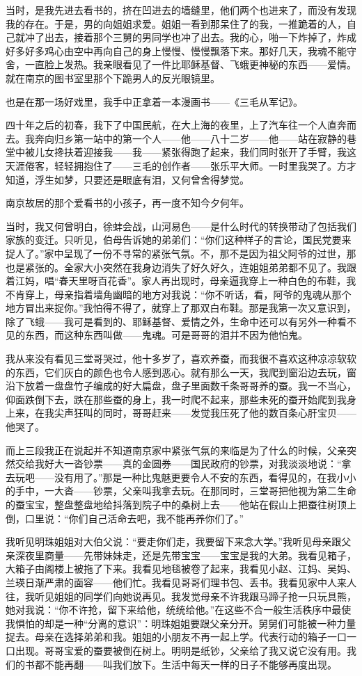 \par 当时，是我先进去看书的，挤在凹进去的墙缝里，他们两个也进来了，而没有发现我的存在。于是，男的向姐姐求爱。姐姐一看到那呆住了的我，一推跪着的人，自己就冲了出去，接着那个三舅的男同学也冲了出去。我的心，啪一下炸掉了，炸成好多好多鸡心由空中再向自己的身上慢慢、慢慢飘落下来。那好几天，我魂不能守舍，一直脸上发热。我亲眼看见了一件比耶稣基督、飞蛾更神秘的东西——爱情。就在南京的图书室里那个下跪男人的反光眼镜里。
\par 也是在那一场好戏里，我手中正拿着一本漫画书——《三毛从军记》。
\par 四十年之后的初春，我下了中国民航，在大上海的夜里，上了汽车往一个人直奔而去。我奔向归乡第一站中的第一个人——他——八十二岁——他——站在寂静的巷堂中被儿女搀扶着迎接我——我——紧张得跑了起来，我们同时张开了手臂，我这天涯倦客，轻轻拥抱住了——三毛的创作者——张乐平大师。一时里我哭了。方才知道，浮生如梦，只要还是眼底有泪，又何曾舍得梦觉。
\par 南京故居的那个爱看书的小孩子，再一度不知今夕何年。
\par 当时，我又何曾明白，徐蚌会战，山河易色——是什么时代的转换带动了包括我们家族的变迁。只听见，伯母告诉她的弟弟们：“你们这种样子的言论，国民党要来捉人了。”家中呈现了一份不寻常的紧张气氛。不，那不是因为祖父阿爷的过世，那也是紧张的。全家大小突然在我身边消失了好久好久，连姐姐弟弟都不见了。我跟着江妈，唱“春天里呀百花香”。家人再出现时，母亲逼我穿上一种白色的布鞋，我不肯穿上，母亲指着墙角幽暗的地方对我说：“你不听话，看，阿爷的鬼魂从那个地方冒出来捉你。”我怕得不得了，就穿上了那双白布鞋。那是我第一次又意识到，除了飞蛾——我可是看到的、耶稣基督、爱情之外，生命中还可以有另外一种看不见的东西，而这种东西叫做——鬼魂。可是哥哥的泪并不因为他怕鬼。
\par 我从来没有看见三堂哥哭过，他十多岁了，喜欢养蚕，而我很不喜欢这种凉凉软软的东西，它们灰白的颜色也令人感到恶心。就有那么一天，我爬到窗沿边去玩，窗沿下放着一盘盘竹子编成的好大扁盘，盘子里面数千条哥哥养的蚕。我一不当心，仰面跌倒下去，跌在那些蚕的身上，我一时爬不起来，那些未死的蚕开始爬到我身上来，在我尖声狂叫的同时，哥哥赶来——发觉我压死了他的数百条心肝宝贝——他哭了。
\par 而上三段我正在说起并不知道南京家中紧张气氛的来临是为了什么的时候，父亲突然交给我好大一沓钞票——真的金圆券——国民政府的钞票，对我淡淡地说：“拿去玩吧——没有用了。”那是一种比鬼魅更要令人不安的东西，看得见的，在我小小的手中，一大沓——钞票，父亲叫我拿去玩。在那同时，三堂哥把他视为第二生命的蚕宝宝，整盘整盘地给抖落到院子中的桑树上去——他站在假山上把蚕往树顶上倒，口里说：“你们自己活命去吧，我不能再养你们了。”
\par 我听见明珠姐姐对大伯父说：“要走你们走，我要留下来念大学。”我听见母亲跟父亲深夜里商量——先带妹妹走，还是先带宝宝——宝宝是我的大弟。我看见箱子，大箱子由阁楼上被拖了下来。我看见地毯被卷了起来，我看见小赵、江妈、吴妈、兰瑛日渐严肃的面容——他们忙。我看见哥哥们理书包、丢书。我看见家中人来人往，我听见姐姐的同学们向她说再见。我发觉母亲不许我跟马蹄子抢一只玩具熊，她对我说：“你不许抢，留下来给他，统统给他。”在这些不合一般生活秩序中最使我惧怕的却是一种“分离的意识”：明珠姐姐要跟父亲分开。舅舅们可能被一种力量捉去。母亲在选择弟弟和我。姐姐的小朋友不再一起上学。代表行动的箱子一口一口出现。哥哥宝爱的蚕要被倒在树上。明明是纸钞，父亲给了我又说它没有用。我们的书都不能再翻——叫我们放下。生活中每天一样的日子不能够再度出现。
